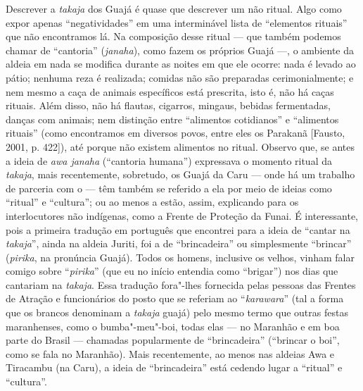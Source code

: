 Descrever a \emph{takaja} dos Guajá é quase que descrever um não ritual.
Algo como expor apenas ``negatividades'' em uma interminável lista de
``elementos rituais'' que não encontramos lá. Na composição desse ritual
--- que também podemos chamar de ``cantoria'' (\emph{janaha}), como fazem
os próprios Guajá ---, o ambiente da aldeia em nada se modifica durante as
noites em que ele ocorre: nada é levado ao pátio; nenhuma reza é
realizada; comidas não são preparadas cerimonialmente; e nem mesmo a
caça de animais específicos está prescrita, isto é, não há caças
rituais. Além disso, não há flautas, cigarros, mingaus, bebidas
fermentadas, danças com animais; nem distinção entre ``alimentos
cotidianos'' e ``alimentos rituais'' (como encontramos em diversos povos,
entre eles os Parakanã {[}Fausto, 2001, p. 422{]}), até porque não
existem alimentos no ritual. Observo que, se antes a ideia de \emph{awa
janaha} (``cantoria humana'') expressava o momento ritual da
\emph{takaja}, mais recentemente, sobretudo, os Guajá da  Caru --- onde
há um trabalho de parceria com o  --- têm também se referido a ela por
meio de ideias como ``ritual'' e ``cultura''; ou ao menos a estão,
assim, explicando para os interlocutores não indígenas, como a Frente de
Proteção da Funai. É interessante, pois a primeira tradução em português
que encontrei para a ideia de ``cantar na \emph{takaja}'', ainda na
aldeia Juriti, foi a de ``brincadeira'' ou simplesmente ``brincar''
(\emph{pirika}, na pronúncia Guajá). Todos os homens, inclusive os
velhos, vinham falar comigo sobre ``\emph{pirika}'' (que eu no início
entendia como ``brigar'') nos dias que cantariam na \emph{takaja}. Essa
tradução fora"-lhes fornecida pelas pessoas das Frentes de Atração e
funcionários do posto que se referiam ao ``\emph{karawara}'' (tal a
forma que os brancos denominam a \emph{takaja} guajá) pelo mesmo termo
que outras festas maranhenses, como o bumba"-meu"-boi, todas elas --- no
Maranhão e em boa parte do Brasil --- chamadas popularmente de
``brincadeira'' (``brincar o boi'', como se fala no Maranhão). Mais
recentemente, ao menos nas aldeias Awa e Tiracambu (na  Caru), a ideia
de ``brincadeira'' está cedendo lugar a ``ritual'' e ``cultura''.

